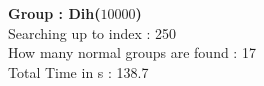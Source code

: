 \textbf{Group : Dih($10000$)}\\
Searching up to index : 250\\
How many normal groups are found : 17\\
Total Time in s : 138.7\\
